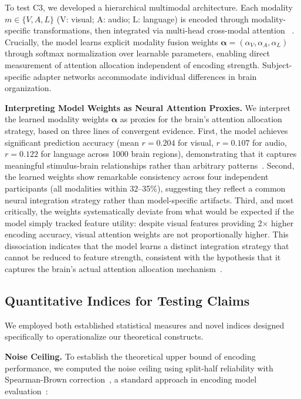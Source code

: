 \documentclass[10pt,letterpaper]{article}
\begin{document}
To test C3, we developed a hierarchical multimodal architecture. Each modality $m \in \{V, A, L\}$ (V: visual; A: audio; L: language) is encoded through modality-specific transformations, then integrated via multi-head cross-modal attention ~\citep{vaswani2017attention}. Crucially, the model learns explicit modality fusion weights $\boldsymbol{\alpha} = (\alpha_V, \alpha_A, \alpha_L)$ through softmax normalization over learnable parameters, enabling direct measurement of attention allocation independent of encoding strength. Subject-specific adapter networks accommodate individual differences in brain organization.

{\color{red}\textbf{Interpreting Model Weights as Neural Attention Proxies.} We interpret the learned modality weights $\boldsymbol{\alpha}$ as proxies for the brain's attention allocation strategy, based on three lines of convergent evidence. First, the model achieves significant prediction accuracy (mean $r = 0.204$ for visual, $r = 0.107$ for audio, $r = 0.122$ for language across 1000 brain regions), demonstrating that it captures meaningful stimulus-brain relationships rather than arbitrary patterns~\citep{kriegeskorte2008representational,yamins2016using}. Second, the learned weights show remarkable consistency across four independent participants (all modalities within 32--35\%), suggesting they reflect a common neural integration strategy rather than model-specific artifacts. Third, and most critically, the weights systematically deviate from what would be expected if the model simply tracked feature utility: despite visual features providing 2$\times$ higher encoding accuracy, visual attention weights are not proportionally higher. This dissociation indicates that the model learns a distinct integration strategy that cannot be reduced to feature strength, consistent with the hypothesis that it captures the brain's actual attention allocation mechanism~\citep{lindsay2020attention}.}

\subsection{Quantitative Indices for Testing Claims}

We employed both established statistical measures and novel indices designed specifically to operationalize our theoretical constructs.

\textbf{Noise Ceiling.} To establish the theoretical upper bound of encoding performance, we computed the noise ceiling using split-half reliability with Spearman-Brown correction~\citep{spearman1910correlation}, a standard approach in encoding model evaluation~\citep{schoppe2016measuring}:
\end{document}
